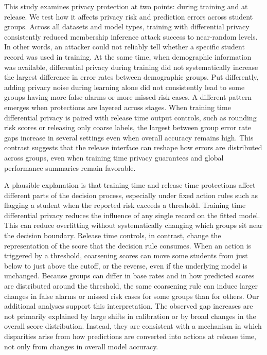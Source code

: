\documentclass{edm_article}
\begin{document}
This study examines privacy protection at two points: during training and at release. We test how it affects privacy risk and prediction errors across student groups. Across all datasets and model types, training with differential privacy consistently reduced membership inference attack success to near-random levels. In other words, an attacker could not reliably tell whether a specific student record was used in training. At the same time, when demographic information was available, differential privacy during training did not systematically increase the largest difference in error rates between demographic groups. Put differently, adding privacy noise during learning alone did not consistently lead to some groups having more false alarms or more missed-risk cases. A different pattern emerges when protections are layered across stages. When training time differential privacy is paired with release time output controls, such as rounding risk scores or releasing only coarse labels, the largest between group error rate gaps increase in several settings even when overall accuracy remains high. This contrast suggests that the release interface can reshape how errors are distributed across groups, even when training time privacy guarantees and global performance summaries remain favorable.


A plausible explanation is that training time and release time protections affect different parts of the decision process, especially under fixed action rules such as flagging a student when the reported risk exceeds a threshold. Training time differential privacy reduces the influence of any single record on the fitted model. This can reduce overfitting without systematically changing which groups sit near the decision boundary. Release time controls, in contrast, change the representation of the score that the decision rule consumes. When an action is triggered by a threshold, coarsening scores can move some students from just below to just above the cutoff, or the reverse, even if the underlying model is unchanged. Because groups can differ in base rates and in how predicted scores are distributed around the threshold, the same coarsening rule can induce larger changes in false alarms or missed risk cases for some groups than for others. Our additional analyses support this interpretation. The observed gap increases are not primarily explained by large shifts in calibration or by broad changes in the overall score distribution. Instead, they are consistent with a mechanism in which disparities arise from how predictions are converted into actions at release time, not only from changes in overall model accuracy.
\end{document}
